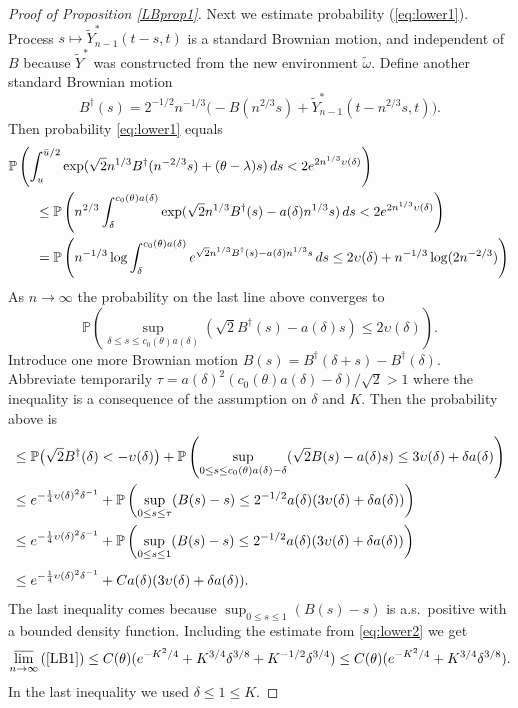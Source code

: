 \documentclass[11pt]{amsart}
\numberwithin{equation}{section}
\theoremstyle{remark}
\begin{document}
\begin{proof}[Proof of Proposition \ref{LBprop1}]
Next we  estimate probability (\ref{eq:lower1}). 
Process $s\mapsto \tilde Y^*_{n-1}(t-s,t)$  is 
  a standard Brownian motion, and   independent of $B$ because
$\tilde Y^*$ was constructed from the new environment $\tilde{\omega}$.   Define another 
standard Brownian motion  
\begin{equation}\nonumber B^\dagger (s)= 2^{-1/2}n^{-1/3}  \bigl(-B(n^{2/3}s)+\tilde Y^*_{n-1}(t-n^{2/3}s,t)\bigr).\end{equation} 
Then  probability \eqref{eq:lower1} equals  
\begin{align}
&{\mathbb{P}}\left(
\int_u^{\bar u/2} \exp( \sqrt{2}n^{1/3}B^\dagger(n^{-2/3}s)+({\theta}-\lambda) s) \,ds<2e^{2 n^{1/3} \upsilon(\delta)}
\right){\nonumber}\\ 
&\qquad \le 
{\mathbb{P}}\left(n^{2/3}
\int_\delta^{c_0({\theta})a(\delta)} \exp(\sqrt{2} n^{1/3} B^{\dagger}(s)-a(\delta) n^{1/3} s) \,ds<2e^{2 n^{1/3} \upsilon(\delta)}
\right){\nonumber}\\
&\qquad =
{\mathbb{P}}\left(n^{-1/3} \log
\int_\delta^{c_0({\theta})a(\delta)}  e^{\sqrt{2} n^{1/3} B^{\dagger}(s)-a(\delta) n^{1/3} s}
\,ds\le2 \upsilon(\delta) +n^{-1/3} \log(2n^{-2/3})
\right)  {\nonumber}\label{eq:lower2}
\end{align}
 As $n\to\infty$ the probability on the last line above converges to
\[
{\mathbb{P}}\left(\sup_{\delta\le s\le c_0({\theta})a(\delta)}(
\sqrt{2} B^{\dagger}(s)-a(\delta)  s) \le2 \upsilon(\delta) 
\right).
\]
 Introduce one more   Brownian motion  
$B(s)= B^{\dagger}(\delta+s)-B^{\dagger}(\delta)$. 
Abbreviate temporarily  $\tau=a(\delta)^2 (c_0({\theta})a(\delta)-\delta)/\sqrt 2 >1$
where the inequality is a consequence of the assumption on $\delta$ and $K$.  
 Then the 
probability above is  
\begin{align*}
&\le {\mathbb{P}}\bigl(\sqrt{2} B^{\dagger}(\delta)<- \upsilon(\delta)\bigr)
+{\mathbb{P}}\left(\sup_{0\le s\le c_0({\theta})a(\delta)-\delta}(
\sqrt{2} B(s)-a(\delta)  s) \le 3 \upsilon(\delta)+\delta a(\delta) 
\right){\nonumber}\\ {\nonumber}
&\le  e^{- \frac14\upsilon(\delta)^2 \delta^{-1}}
+{\mathbb{P}}\left(\sup_{0\le s\le  \tau}(
 B(s)-  s) \le 2^{-1/2}a(\delta)(3 \upsilon(\delta)+\delta a(\delta) )
\right)\\
&\le  e^{- \frac14\upsilon(\delta)^2 \delta^{-1}}
+   {\mathbb{P}}\left(\sup_{0\le s\le 1}(
 B(s)-  s) \le 2^{-1/2}a(\delta)(3 \upsilon(\delta)+\delta a(\delta))
\right)\\[3pt]
&\le e^{- \frac14\upsilon(\delta)^2 \delta^{-1}}
+  C a(\delta)(3\upsilon(\delta)+\delta a(\delta) ). 
\end{align*}
The last inequality comes because  $\sup_{0\le s\le 1} ( B(s)-  s)$ is a.s.~positive with a bounded density function. Including the estimate from \eqref{eq:lower2}  we get
\begin{equation} \label{eq:LB1}
\varlimsup_{n\to \infty} \, (\ref{LB1})\le  C({\theta}) (e^{- K^2/4  }+ K^{3/4}\delta^{3/8} 
 +  K^{-1/2}\delta^{3/4}  ) \le   C({\theta})(e^{- K^2/4  }+ K^{3/4}\delta^{3/8}) .
\end{equation} 
{In the last inequality we used $\delta\le 1\le K$.}


\end{proof}
\end{document}
